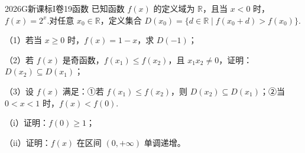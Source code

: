 
\begin{problem}{2026}{G}{新课标I卷}{19}{函数}
已知函数 $ f(x) $ 的定义域为 $ \mathbb{R} $，且当 $ x<0 $ 时，$ f(x)=2^x $.对任意 $ x_0\in\mathbb{R} $，定义集合 $ D(x_0)=\{d\in\mathbb{R}\mid f(x_0+d)>f(x_0)\} $.

（1）若当 $ x\geq0 $ 时，$ f(x)=1-x $，求 $ D(-1) $；

（2）若 $ f(x) $ 是奇函数，$ f(x_1)\leq f(x_2) $，且 $ x_1x_2\neq0 $，证明：$ D(x_2)\subseteq D(x_1) $；

（3）设 $ f(x) $ 满足：①若 $ f(x_1)\leq f(x_2) $，则 $ D(x_2)\subseteq D(x_1) $；②当 $ 0<x<1 $ 时，$ f(x)<f(0) $.

（i）证明：$ f(0)\geq1 $；

（ii）证明：$ f(x) $ 在区间 $ (0,+\infty) $ 单调递增。
\end{problem}

\begin{answer}

\end{answer}

\begin{solutions}

\end{solutions}